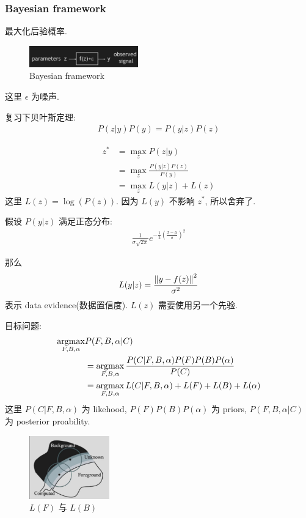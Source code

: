 \subsubsection{Bayesian framework}
最大化后验概率. 
    
\begin{figure}[!htb]
    \centering
    \includegraphics[width=0.42\textwidth]{pic/ACG9/Bayesian framework}
    \caption{Bayesian framework}
\end{figure}
这里 $\epsilon$ 为噪声.

复习下贝叶斯定理: 
\begin{align*}
    P(z|y)P(y)=P(y|z)P(z)
\end{align*}

\begin{align*}
    z^*&=\max_zP(z|y)\\
    &=\max_z\frac{P(y|z)P(z)}{P(y)}\\
    &=\max_z L(y|z)+L(z)
\end{align*}
这里 $L(z)=\log(P(z))$. 因为 $L(y)$ 不影响 $z^*$, 所以舍弃了.

假设 $P(y|z)$ 满足正态分布:
\begin{align*}
    \frac{1}{\sigma\sqrt{2\pi}}e^{-\frac{1}{2}\left( \frac{x-\mu}{\sigma} \right)^2}
\end{align*}

那么
\begin{align*}
    L(y|z)=\frac{\left\lVert y-f(z)\right\rVert^2}{\sigma^2}
\end{align*}
表示 data evidence(数据置信度). $L(z)$ 需要使用另一个先验. 

目标问题:
\begin{align*}
    \operatorname*{argmax}_{F, B, \alpha}&P(F, B, \alpha|C)\\
    &=\operatorname*{argmax}_{F, B, \alpha}\frac{P(C|F, B, \alpha)P(F)P(B)P(\alpha)}{P(C)}\\
    &=\operatorname*{argmax}_{F, B, \alpha} L(C|F, B, \alpha)+L(F)+L(B)+L(\alpha)
\end{align*}
这里 $P(C|F, B, \alpha)$ 为 likehood, $P(F)P(B)P(\alpha)$ 为 priors, $P(F, B, \alpha|C)$ 为 posterior proability. 


\begin{figure}[!htb]
    \centering
    \includegraphics[width=0.309\textwidth]{pic/ACG9/priors.png}
    \caption{$L(F)$ 与 $L(B)$}
\end{figure}


